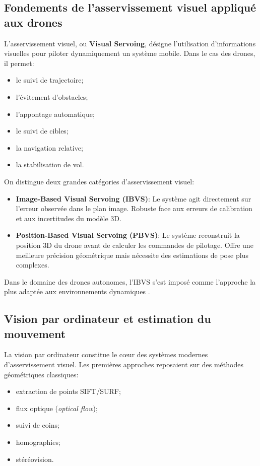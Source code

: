 \documentclass[12pt, a4paper, twoside, openright]{report}
\begin{document}
\subsection{Fondements de l’asservissement visuel appliqué aux drones}
L’asservissement visuel, ou \textbf{Visual Servoing}, désigne l’utilisation d’informations visuelles pour piloter dynamiquement un système mobile. Dans le cas des drones, il permet:
\begin{itemize}
    \item le suivi de trajectoire;
    \item l’évitement d’obstacles;
    \item l’appontage automatique;
    \item le suivi de cibles;
    \item la navigation relative;
    \item la stabilisation de vol.
\end{itemize}

On distingue deux grandes catégories d’asservissement visuel:
\begin{itemize}
    \item \textbf{Image-Based Visual Servoing (IBVS)}: Le système agit directement sur l’erreur observée dans le plan image. Robuste face aux erreurs de calibration et aux incertitudes du modèle 3D.
    \item \textbf{Position-Based Visual Servoing (PBVS)}: Le système reconstruit la position 3D du drone avant de calculer les commandes de pilotage. Offre une meilleure précision géométrique mais nécessite des estimations de pose plus complexes.
\end{itemize}

Dans le domaine des drones autonomes, l’IBVS s’est imposé comme l’approche la plus adaptée aux environnements dynamiques \cite{chaumette2006visual}.

\subsection{Vision par ordinateur et estimation du mouvement}
La vision par ordinateur constitue le cœur des systèmes modernes d’asservissement visuel. Les premières approches reposaient sur des méthodes géométriques classiques:
\begin{itemize}
    \item extraction de points SIFT/SURF;
    \item flux optique (\textit{optical flow});
    \item suivi de coins;
    \item homographies;
    \item stéréovision.
\end{itemize}
\end{document}
